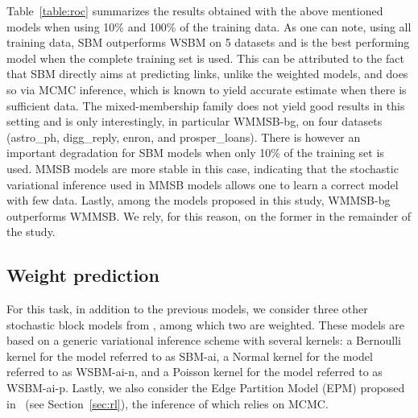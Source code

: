 Table~\ref{table:roc} summarizes the results obtained with the above mentioned models when using 10\% and 100\% of the training data. As one can note, using all training data, SBM outperforms WSBM on 5 datasets and is the best performing model when the complete training set is used. This can be attributed to the fact that SBM directly aims at predicting links, unlike the weighted models, and does so via MCMC inference, which is known to yield accurate estimate when there is sufficient data. The mixed-membership family does not yield good results in this setting and is only interestingly, in particular WMMSB-bg, on four datasets (astro\_ph, digg\_reply, enron, and prosper\_loans). There is however an important degradation for SBM models when only 10\% of the training set is used. MMSB models are more stable in this case, indicating that the stochastic variational inference used in MMSB models allows one to learn a correct model with few data. Lastly, among the models proposed in this study, WMMSB-bg outperforms WMMSB. We rely, for this reason, on the former in the remainder of the study.

\begin{table*}[t]
\centering
	
\label{table:roc}
\end{table*}

\subsection{Weight prediction}

For this task, in addition to the previous models, we consider three other stochastic block models from \cite{aicher2014learning}, among which two are weighted. These models are based on a generic variational inference scheme with several kernels: a Bernoulli kernel for the model referred to as SBM-ai, a Normal kernel for the model referred to as WSBM-ai-n, and a Poisson kernel for the model referred to as WSBM-ai-p. Lastly, we also consider the Edge Partition Model (EPM) proposed in~\cite{zhou2015} (see Section~\ref{sec:rl}), the inference of which relies on MCMC.


